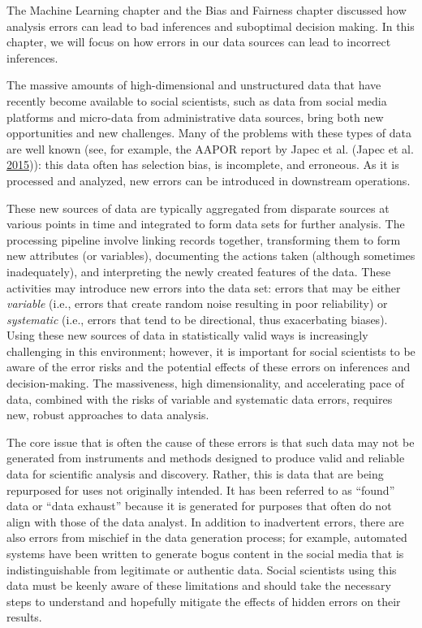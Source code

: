 \documentclass[]{krantz}
\begin{document}
The Machine Learning chapter and the Bias and Fairness chapter discussed
how analysis errors can lead to bad inferences and suboptimal decision
making. In this chapter, we will focus on how errors in our data sources
can lead to incorrect inferences.

The massive amounts of high-dimensional and unstructured data that have
recently become available to social scientists, such as data from social
media platforms and micro-data from administrative data sources, bring
both new opportunities and new challenges. Many of the problems with
these types of data are well known (see, for example, the AAPOR report
by Japec et al. (Japec et al.
\protect\hyperlink{ref-japec2015big}{2015})): this data often has
selection bias, is incomplete, and erroneous. As it is processed and
analyzed, new errors can be introduced in downstream operations.

These new sources of data are typically aggregated from disparate
sources at various points in time and integrated to form data sets for
further analysis. The processing pipeline involve linking records
together, transforming them to form new attributes (or variables),
documenting the actions taken (although sometimes inadequately), and
interpreting the newly created features of the data. These activities
may introduce new errors into the data set: errors that may be either
\emph{variable} (i.e., errors that create random noise resulting in poor
reliability) or \emph{systematic} (i.e., errors that tend to be
directional, thus exacerbating biases). Using these new sources of data
in statistically valid ways is increasingly challenging in this
environment; however, it is important for social scientists to be aware
of the error risks and the potential effects of these errors on
inferences and decision-making. The massiveness, high dimensionality,
and accelerating pace of data, combined with the risks of variable and
systematic data errors, requires new, robust approaches to data
analysis.

The core issue that is often the cause of these errors is that such data
may not be generated from instruments and methods designed to produce
valid and reliable data for scientific analysis and discovery. Rather,
this is data that are being repurposed for uses not originally intended.
It has been referred to as ``found'' data or ``data exhaust'' because it
is generated for purposes that often do not align with those of the data
analyst. In addition to inadvertent errors, there are also errors from
mischief in the data generation process; for example, automated systems
have been written to generate bogus content in the social media that is
indistinguishable from legitimate or authentic data. Social scientists
using this data must be keenly aware of these limitations and should
take the necessary steps to understand and hopefully mitigate the
effects of hidden errors on their results.
\end{document}

